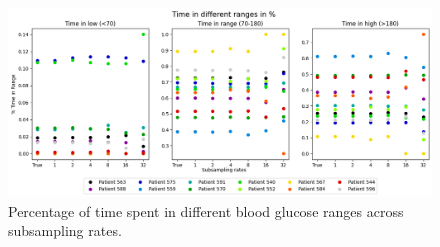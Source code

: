 \begin{figure}[p] %
	\centering
	\includegraphics[width=\linewidth]{Figures/all_patients_time_in_full_range.png} %
	\caption{Percentage of time spent in different blood glucose ranges across subsampling rates.} %
\label{fig:time_in_ranges}  %
\end{figure}



